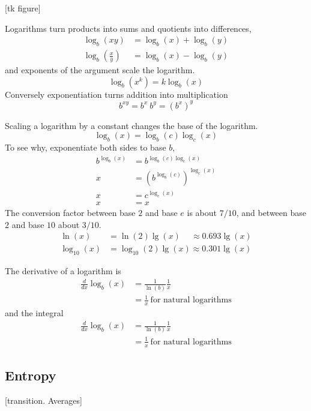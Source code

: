 \documentclass[Lectures.tex]{subfiles}
\begin{document}
[tk figure]

Logarithms turn products into sums and quotients into differences,
\begin{align*}
\log_b(xy) &= \log_b(x) + \log_b(y)  \\
\log_b(\frac{x}{y}) & = \log_b(x) - \log_b(y) 
\end{align*}
and exponents of the argument scale the logarithm.
\[
\log_b(x^k) = k\log_b(x)
\]
Conversely exponentiation turns addition into multiplication
\[
    b^{xy} = b^x\ b^y = (b^x)^y
\]

Scaling a logarithm by a constant changes the base of the logarithm.
\[
	\log_{b}(x)=\log_{b}(c) \log_c(x)
\]
To see why, exponentiate both sides to base $b$,
\begin{align*}
	b^{\log_{b}(x)}&=b^{\log_{b}(c) \log_c(x)}\\
	x & = (b^{\log_{b}(c)})^{\log_c(x)} \\
	x & =c^{\log_c(x)}\\ 
	x & =  x
\end{align*}
The conversion factor between base $2$ and base $e$ is about $7/10$, and between base $2$ and base $10$ about $3/10$.
\begin{align*}
	\ln(x) &= \ln(2) \lg(x)\quad\  \approx 0.693 \lg(x) \\
	\log_{10}(x) &= \log_{10}(2) \lg(x) \approx 0.301 \lg(x)
\end{align*}

The derivative of a logarithm is 
\begin{align*}
\frac{d}{dx}\log_b(x) &= \frac{1}{\ln(b)}\frac{1}{x} \\
& = \frac{1}{x} \ \text{for natural logarithms}
\end{align*}
and the integral
\begin{align*}
\frac{d}{dx}\log_b(x) &= \frac{1}{\ln(b)}\frac{1}{x} \\
& = \frac{1}{x} \ \text{for natural logarithms}
\end{align*}


\subsection{Entropy}
[transition. Averages]
\end{document}

